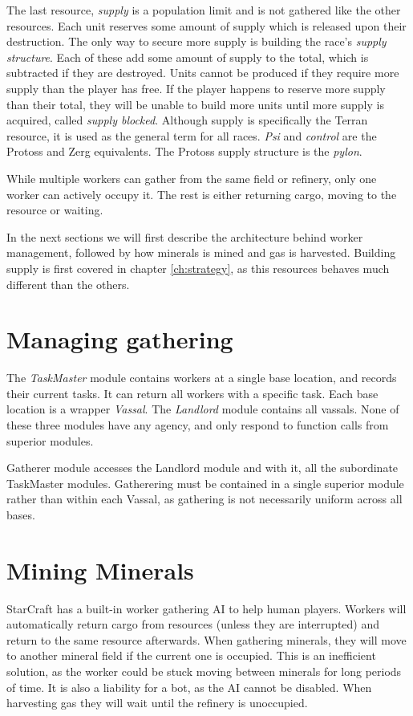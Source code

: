 The last resource, \emph{supply} is a population limit and is not gathered like the other resources. Each unit reserves some amount of supply which is released upon their destruction. The only way to secure more supply is building the race's \emph{supply structure}. Each of these add some amount of supply to the total, which is subtracted if they are destroyed. Units cannot be produced if they require more supply than the player has free. If the player happens to reserve more supply than their total, they will be unable to build more units until more supply is acquired, called \emph{supply blocked}. Although supply is specifically the Terran resource, it is used as the general term for all races. \emph{Psi} and \emph{control} are the Protoss and Zerg equivalents. The Protoss supply structure is the \emph{pylon}.

While multiple workers can gather from the same field or refinery, only one worker can actively occupy it. The rest is either returning cargo, moving to the resource or waiting.

In the next sections we will first describe the architecture behind worker management, followed by how minerals is mined and gas is harvested. Building supply is first covered in chapter \ref{ch:strategy}, as this resources behaves much different than the others.

\section{Managing gathering}

The \emph{TaskMaster} module contains workers at a single base location, and records their current tasks. It can return all workers with a specific task. Each base location is a wrapper \emph{Vassal}. The \emph{Landlord} module contains all vassals. None of these three modules have any agency, and only respond to function calls from superior modules.


Gatherer module accesses the Landlord module and with it, all the subordinate TaskMaster modules. Gatherering must be contained in a single superior module rather than within each Vassal, as gathering is not necessarily uniform across all bases.

\section{Mining Minerals}
StarCraft has a built-in worker gathering AI to help human players. Workers will automatically return cargo from resources (unless they are interrupted) and return to the same resource afterwards. When gathering minerals, they will move to another mineral field if the current one is occupied. This is an inefficient solution, as the worker could be stuck moving between minerals for long periods of time. It is also a liability for a bot, as the AI cannot be disabled. When harvesting gas they will wait until the refinery is unoccupied.

